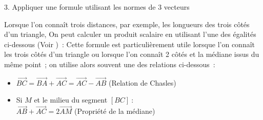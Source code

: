 \begin{h2}3. Appliquer une formule utilisant les normes de 3 vecteurs\end{h2}
Lorsque l'on connaît trois distances, par exemple, les longueurs des trois côtés d'un triangle, On peut calculer un produit scalaire en utilisant l'une des égalités ci-dessous (Voir )~:
Cette formule est particulièrement utile lorsque l'on connaît les trois côtés d'un triangle ou lorsque l'on connaît 2 côtés et la médiane issus du même point~; on utilise alors souvent une des relations ci-dessous~:
\begin{itemize}
     \item
     $\overrightarrow{BC}=\overrightarrow{BA}+\overrightarrow{AC}=\overrightarrow{AC} - \overrightarrow{AB}$ (Relation de Chasles) \\
     \item
     Si $M$ et le milieu du segment $[BC]\ :$ \\
     $\overrightarrow{AB}+\overrightarrow{AC}=2\overrightarrow{AM}$ (Propriété de la médiane)
\end{itemize}
